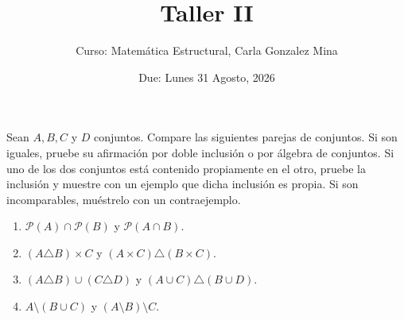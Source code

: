 \documentclass[11pt]{article}
\title{Taller II}
\author{Curso: Matemática Estructural, Carla Gonzalez Mina}
\date{Due: Lunes 31 Agosto, 2026}
\newcommand{\Pow}{\mathcal{P}}
\begin{document}
\maketitle

\begin{question}
Sean $A,B,C$ y $D$ conjuntos. Compare las siguientes parejas de conjuntos. Si son iguales, pruebe su afirmación por doble inclusión o por álgebra de conjuntos. Si uno de los dos conjuntos está contenido propiamente en el otro, pruebe la inclusión y muestre con un ejemplo que dicha inclusión es propia. Si son incomparables, muéstrelo con un contraejemplo.

\begin{enumerate}
  \item[(a)] $\Pow(A)\cap\Pow(B)$ y $\Pow(A\cap B)$.
  \item[(b)] $(A\triangle B)\times C$ y $(A\times C)\triangle(B\times C)$.
  \item[(c)] $(A\triangle B)\cup(C\triangle D)$ y $(A\cup C)\triangle(B\cup D)$.
  \item[(d)] $A\setminus(B\cup C)$ y $(A\setminus B)\setminus C$.
\end{enumerate}
\end{question}
\end{document}

